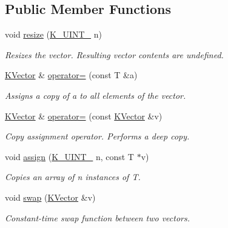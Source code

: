 \subsection*{Public Member Functions}
\begin{DoxyCompactItemize}
\item 
void \mbox{\hyperlink{classKalman_1_1KVector_ae33e27840800fedd713700b0c0fc85d6}{resize}} (\mbox{\hyperlink{namespaceKalman_a628a50cae10f6e2035393d4f96c698bd}{K\+\_\+\+U\+I\+N\+T\+\_}} n)
\begin{DoxyCompactList}\small\item\em Resizes the vector. Resulting vector contents are undefined. \end{DoxyCompactList}\item 
\mbox{\hyperlink{classKalman_1_1KVector}{K\+Vector}} \& \mbox{\hyperlink{classKalman_1_1KVector_abd1d65254f9f9b0c3389bcbc8210b03b}{operator=}} (const T \&a)
\begin{DoxyCompactList}\small\item\em Assigns a copy of {\ttfamily a} to all elements of the vector. \end{DoxyCompactList}\item 
\mbox{\hyperlink{classKalman_1_1KVector}{K\+Vector}} \& \mbox{\hyperlink{classKalman_1_1KVector_a104d50690d7c6746219b9d8ca9002c93}{operator=}} (const \mbox{\hyperlink{classKalman_1_1KVector}{K\+Vector}} \&v)
\begin{DoxyCompactList}\small\item\em Copy assignment operator. Performs a deep copy. \end{DoxyCompactList}\item 
void \mbox{\hyperlink{classKalman_1_1KVector_ae2adbc92a6c8af12f05135cbca65b31a}{assign}} (\mbox{\hyperlink{namespaceKalman_a628a50cae10f6e2035393d4f96c698bd}{K\+\_\+\+U\+I\+N\+T\+\_}} n, const T $\ast$v)
\begin{DoxyCompactList}\small\item\em Copies an array of {\ttfamily n} instances of {\ttfamily T}. \end{DoxyCompactList}\item 
void \mbox{\hyperlink{classKalman_1_1KVector_a2e79205138c28503253a5a8b13ca7572}{swap}} (\mbox{\hyperlink{classKalman_1_1KVector}{K\+Vector}} \&v)
\begin{DoxyCompactList}\small\item\em Constant-\/time swap function between two vectors. \end{DoxyCompactList}\end{DoxyCompactItemize}
